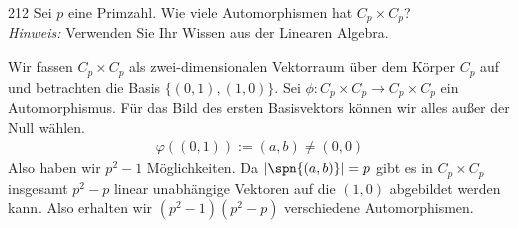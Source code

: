 \begin{algebraUE}{212}
  Sei $p$ eine Primzahl. Wie viele Automorphismen hat $C_p \times C_p$? \\
  \textit{Hinweis:} Verwenden Sie Ihr Wissen aus der Linearen Algebra.
\end{algebraUE}
\begin{solution}
  Wir fassen $C_p \times C_p$ als zwei-dimensionalen Vektorraum über dem Körper $C_p$
  auf und betrachten die Basis $\{(0,1),(1,0)\}$.
  Sei $\phi: C_p \times C_p \rightarrow C_p \times C_p$ ein Automorphismus.
  Für das Bild des ersten Basisvektors können wir alles außer der Null wählen.
  \begin{align*}
    \varphi((0,1)) := (a,b) \neq (0,0)
  \end{align*}
  Also haben wir $p^2 - 1$ Möglichkeiten.
  Da $|\spn\{(a,b)\}| = p$ gibt es in $C_p \times C_p$ insgesamt $p^2 - p$
  linear unabhängige Vektoren auf die $(1,0)$ abgebildet werden kann.
  Also erhalten wir $(p^2 - 1)(p^2 - p)$ verschiedene Automorphismen.
\end{solution}

